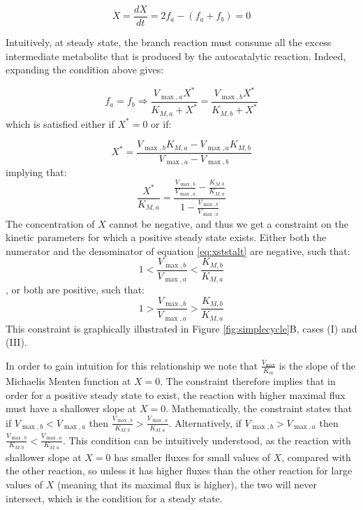     \begin{equation}
      \label{eq:xdyna}
      \dot X = \frac{dX}{dt} = 2f_a - (f_a + f_b) = 0
    \end{equation}

    Intuitively, at steady state, the branch reaction must consume all the excess intermediate metabolite that is produced by the autocatalytic reaction.
    Indeed, expanding the condition above gives:

    \begin{equation*}
      f_a = f_b \Rightarrow \frac{V_{\max,a}X^*}{K_{M,a}+X^*}=\frac{V_{\max,b}X^*}{K_{M,b}+X^*}
    \end{equation*}
    which is satisfied either if $X^*=0$ or if:

    \begin{equation}
      \label{eq:xstst}
      X^*=\frac{V_{\max,b}K_{M,a}-V_{\max,a}K_{M,b}}{V_{\max,a}-V_{\max,b}}
    \end{equation}
    implying that:
    \begin{equation}
      \label{eq:xststalt}
      \frac{X^*}{K_{M,a}}=\frac{\frac{V_{\max,b}}{V_{\max,a}}-\frac{K_{M,b}}{K_{M,a}}}{1-\frac{V_{\max,b}}{V_{\max,a}}}
    \end{equation}
    The concentration of $X$ cannot be negative, and thus we get a constraint on the kinetic parameters for which a positive steady state exists.
    Either both the numerator and the denominator of equation \ref{eq:xststalt} are negative, such that:
    \begin{equation*}
    1<\frac{V_{\max,b}}{V_{\max,a}}<\frac{K_{M,b}}{K_{M,a}}
    \end{equation*}
    , or both are positive, such that:
    \begin{equation*}
    1>\frac{V_{\max,b}}{V_{\max,a}}>\frac{K_{M,b}}{K_{M,a}}
    \end{equation*}
    This constraint is graphically illustrated in Figure \ref{fig:simplecycle}B, cases (I) and (III).

    In order to gain intuition for this relationship we note that $\frac{V_{\max}}{K_m}$ is the slope of the Michaelis Menten function at $X=0$.
    The constraint therefore implies that in order for a positive steady state to exist, the reaction with higher maximal flux must have a shallower slope at $X=0$.
    Mathematically, the constraint states that if $V_{\max,b}<V_{\max,a}$ then $\frac{V_{\max,b}}{K_{M,b}}>\frac{V_{\max,a}}{K_{M,a}}$.
    Alternatively, if $V_{\max,b}>V_{\max,a}$ then $\frac{V_{\max,b}}{K_{M,b}}<\frac{V_{\max,a}}{K_{M,a}}$.
    This condition can be intuitively understood, as the reaction with shallower slope at $X=0$ has smaller fluxes for small values of $X$, compared with the other reaction, so unless it has higher fluxes than the other reaction for large values of $X$ (meaning that its maximal flux is higher), the two will never intersect, which is the condition for a steady state.

